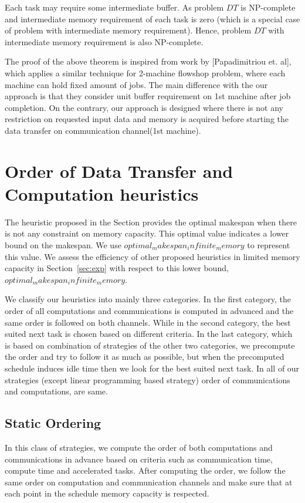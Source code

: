\documentclass[runningheads]{llncs} %
\begin{document}
Each task may require some intermediate buffer. As problem $DT$ is NP-complete and intermediate 
memory requirement of each task is zero (which is a special case of problem with intermediate memory 
requirement). Hence, problem $DT$ with intermediate memory requirement is also NP-complete.





The proof of the above theorem is inspired from work by [Papadimitriou et. al], which applies a similar 
technique for 2-machine flowshop problem, where each machine can hold fixed amount of jobs. The 
main difference with the our approach is that they consider unit buffer requirement on 1st machine 
after job completion. On the contrary, our approach is designed where there is not any restriction on 
requested input data and memory is acquired before starting the data transfer on communication 
channel(1st machine).


	
	\section{Order of Data Transfer and Computation heuristics}
	\label{sec:heuristics}

The heuristic proposed in the Section provides the optimal makespan when there is not any constraint on memory capacity. This optimal value indicates a lower bound on the makespan. We use $optimal_makespan_infinite_memory$ to represent this value. We assess the efficiency of other proposed heuristics in limited memory capacity in Section~\ref{sec:exp} with respect to this lower bound, $optimal_makespan_infinite_memory$.


We classify our heuristics into mainly three categories. In the first category, the order of all computations and communications is computed in advanced and the same order is followed on both channels. While in the second category, the best suited next task is chosen based on different criteria. In the last category, which is based on combination of strategies of the other two categories, we precompute the order and try to follow it as much as possible, but when the precomputed schedule induces idle time then we look for the best suited next task. In all of our strategies (except linear programming based strategy) order of communications and computations, are same.

\subsection{Static Ordering}
In this class of strategies, we compute the order of both computations and communications in advance based on criteria such as communication time, compute time and accelerated tasks. After computing the order, we follow the same order on computation and communication channels and make sure that at each point in the schedule memory capacity is respected.
\end{document}

